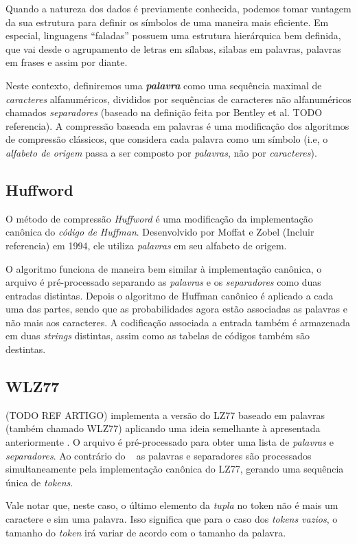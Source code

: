 Quando a natureza dos dados é previamente conhecida, podemos tomar vantagem da sua estrutura para definir os símbolos de uma maneira mais eficiente. 
Em especial, linguagens ``faladas'' possuem uma estrutura hierárquica bem definida, que vai desde o agrupamento de letras em sílabas, silabas em palavras, palavras em frases e assim por diante. 

Neste contexto, definiremos uma \textbf{\emph{palavra}} como uma sequência maximal de \emph{caracteres} alfanuméricos, divididos por sequências de caracteres não alfanuméricos chamados \emph{separadores} (baseado na definição feita por Bentley et al. TODO referencia).
A compressão baseada em palavras é uma modificação dos algoritmos de compressão clássicos, que considera cada palavra como um símbolo (i.e, o \emph{alfabeto de origem} passa a ser composto por \emph{palavras}, não por \emph{caracteres}).

\subsection{Huffword} \label{sub:huffw}
O método de compressão \emph{Huffword} é uma modificação da implementação canônica do \emph{código de Huffman}. 
Desenvolvido por Moffat e Zobel (Incluir referencia) em 1994, ele utiliza \emph{palavras} em seu alfabeto de origem.

O algoritmo funciona de maneira bem similar à implementação canônica, o arquivo é pré-processado separando as \emph{palavras} e os \emph{separadores} como duas entradas distintas.
Depois o algoritmo de Huffman canônico é aplicado a cada uma das partes, sendo que as probabilidades agora estão associadas as palavras e não mais aos caracteres. 
A codificação associada a entrada também é armazenada em duas \emph{strings} distintas, assim como as tabelas de códigos também são destintas.
 
 \subsection{WLZ77}
 (TODO REF ARTIGO) implementa a versão do LZ77 baseado em palavras (também chamado WLZ77) aplicando uma ideia semelhante à apresentada anteriormente . 
 O arquivo é pré-processado para obter uma lista de \emph{palavras} e \emph{separadores}. 
 Ao contrário do ~ as palavras e separadores são processados simultaneamente pela implementação canônica do LZ77, gerando uma sequência única de \emph{tokens}.
 
 Vale notar que, neste caso, o último elemento da \emph{tupla} no token não é mais um caractere e sim uma palavra. Isso significa que para o caso dos \emph{tokens vazios}, o tamanho do \emph{token} irá variar de acordo com o tamanho da palavra.
 
